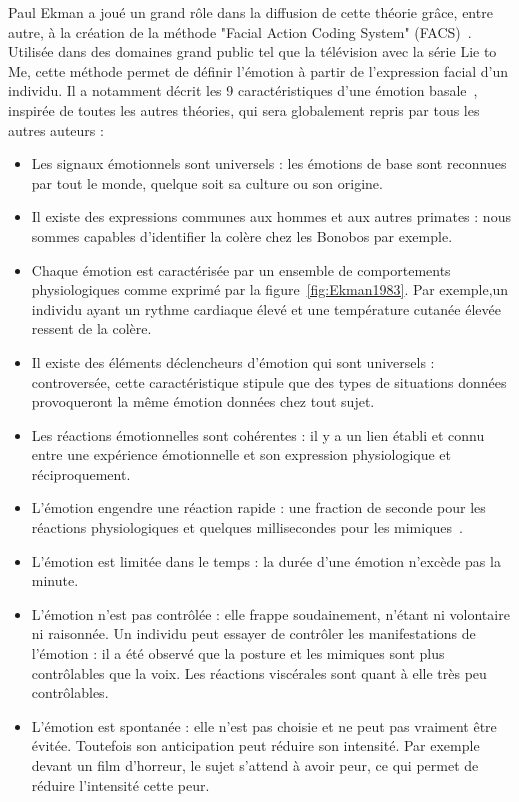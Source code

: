 Paul Ekman a joué un grand rôle dans la diffusion de cette théorie grâce, entre autre, à la création de la méthode "Facial Action Coding System" (FACS)~\cite{Ekman1978}. Utilisée dans des domaines grand public tel que la télévision avec la série Lie to Me, cette méthode permet de définir l'émotion à partir de l'expression facial d'un individu. Il a notamment décrit les 9 caractéristiques d'une émotion basale~\cite{Ekman1992}, inspirée de toutes les autres théories, qui sera globalement repris par tous les autres auteurs :
\begin{itemize}
  \item Les signaux émotionnels sont universels : les émotions de base sont reconnues par tout le monde, quelque soit sa culture ou son origine.
  \item Il existe des expressions communes aux hommes et aux autres primates : nous sommes capables d'identifier la colère chez les Bonobos par exemple.
  \item Chaque émotion est caractérisée par un ensemble de comportements physiologiques comme exprimé par la figure~\ref{fig:Ekman1983}. Par exemple,un individu ayant un rythme cardiaque élevé et une température cutanée élevée ressent de la colère.
  
  \item Il existe des éléments déclencheurs d'émotion qui sont universels : controversée, cette caractéristique stipule que des types de situations données provoqueront la même émotion données chez tout sujet.
  \item Les réactions émotionnelles sont cohérentes : il y a un lien établi et connu entre une expérience émotionnelle et son expression physiologique et réciproquement.
  \item L'émotion engendre une réaction rapide : une fraction de seconde pour les réactions physiologiques et quelques millisecondes pour les mimiques~\cite{Ekman1978}.
  \item L'émotion est limitée dans le temps : la durée d'une émotion n'excède pas la minute.
  \item L'émotion n'est pas contrôlée : elle frappe soudainement, n'étant ni volontaire ni raisonnée. Un individu peut essayer de contrôler les manifestations de l'émotion : il a été observé que la posture et les mimiques sont plus contrôlables que la voix. Les réactions viscérales sont quant à elle très peu contrôlables.
  \item L'émotion est spontanée : elle n'est pas choisie et ne peut pas vraiment être évitée. Toutefois son anticipation peut réduire son intensité. Par exemple devant un film d'horreur, le sujet s'attend à avoir peur, ce qui permet de réduire l'intensité cette peur.
\end{itemize}

